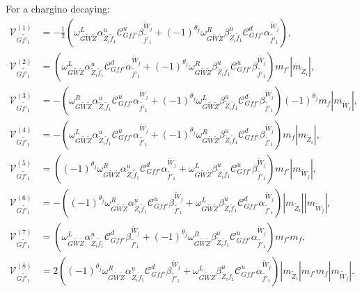 \documentclass[final,3p,times,pdflatex]{elsarticle}
\begin{document}
For a chargino decaying:
\begin{align}
\mathcal{V}_{G \tilde{f'}_1}^{(1)} &= -\frac{1}{2}(\omega_{G \tilde{W} \tilde{Z}}^L   \alpha_{\tilde{Z}_i \tilde{f}_1}^{u}  \mathcal{C}_{G f f'}^u  \beta_{\tilde{f'}_1}^{\tilde{W}_j} +  (-1)^{\theta_f}\omega_{G \tilde{W} \tilde{Z}}^R  \beta_{\tilde{Z}_i \tilde{f}_1}^{u}  \mathcal{C}_{G f f'}^d  \alpha_{\tilde{f'}_1}^{\tilde{W}_j}), \\
\mathcal{V}_{G \tilde{f'}_1}^{(2)} &= (\omega_{G \tilde{W} \tilde{Z}}^L  \alpha_{\tilde{Z}_i \tilde{f}_1}^{u}  \mathcal{C}_{G f f'}^d  \alpha_{\tilde{f'}_1}^{\tilde{W}_j} +  (-1)^{\theta_j}\omega_{G \tilde{W} \tilde{Z}}^R  \beta_{\tilde{Z}_i \tilde{f}_1}^{u}  \mathcal{C}_{G f f'}^u  \beta_{\tilde{f'}_1}^{\tilde{W}_j})m_{f'}|m_{\tilde{Z}_i}|, \\
\mathcal{V}_{G \tilde{f'}_1}^{(3)} &= -(\omega_{G \tilde{W} \tilde{Z}}^R  \alpha_{\tilde{Z}_i \tilde{f}_1}^{u}  \mathcal{C}_{G f f'}^u  \alpha_{\tilde{f'}_1}^{\tilde{W}_j} +  (-1)^{\theta_j}\omega_{G \tilde{W} \tilde{Z}}^L  \beta_{\tilde{Z}_i \tilde{f}_1}^{u}  \mathcal{C}_{G f f'}^d  \beta_{\tilde{f'}_1}^{\tilde{W}_j})(-1)^{\theta_j} m_{f}|m_{\tilde{W}_j}|, \\
\mathcal{V}_{G \tilde{f'}_1}^{(4)} &= -(\omega_{G \tilde{W} \tilde{Z}}^L   \alpha_{\tilde{Z}_i \tilde{f}_1}^{u}  \mathcal{C}_{G f f'}^u  \alpha_{\tilde{f'}_1}^{\tilde{W}_j} +  (-1)^{\theta_j}\omega_{G \tilde{W} \tilde{Z}}^R  \beta_{\tilde{Z}_i \tilde{f}_1}^{u}  \mathcal{C}_{G f f'}^d  \beta_{\tilde{f'}_1}^{\tilde{W}_j})m_{f}|m_{\tilde{Z}_i}|, \\
\mathcal{V}_{G \tilde{f'}_1}^{(5)} &= ((-1)^{\theta_j}\omega_{G \tilde{W} \tilde{Z}}^R \alpha_{\tilde{Z}_i \tilde{f}_1}^{u}  \mathcal{C}_{G f f'}^d  \alpha_{\tilde{f'}_1}^{\tilde{W}_j} + \omega_{G \tilde{W} \tilde{Z}}^L  \beta_{\tilde{Z}_i \tilde{f}_1}^{u}  \mathcal{C}_{G f f'}^u  \beta_{\tilde{f'}_1}^{\tilde{W}_j})m_{f'} |m_{\tilde{W}_j}|,\\
\mathcal{V}_{G \tilde{f'}_1}^{(6)} &= -((-1)^{\theta_j}\omega_{G \tilde{W} \tilde{Z}}^R \alpha_{\tilde{Z}_i \tilde{f}_1}^{u}  \mathcal{C}_{G f f'}^u  \beta_{\tilde{f'}_1}^{\tilde{W}_j} + \omega_{G \tilde{W} \tilde{Z}}^L  \beta_{\tilde{Z}_i \tilde{f}_1}^{u}  \mathcal{C}_{G f f'}^d  \alpha_{\tilde{f'}_1}^{\tilde{W}_j})|m_{\tilde{Z}_i}||m_{\tilde{W}_j}| ,\\
\mathcal{V}_{G \tilde{f'}_1}^{(7)} &= (\omega_{G \tilde{W} \tilde{Z}}^L \alpha_{\tilde{Z}_i \tilde{f}_1}^{u}  \mathcal{C}_{G f f'}^d  \beta_{\tilde{f'}_1}^{\tilde{W}_j} + (-1)^{\theta_j}\omega_{G \tilde{W} \tilde{Z}}^R  \beta_{\tilde{Z}_i \tilde{f}_1}^{u} \mathcal{C}_{G f f'}^u \alpha_{\tilde{f'}_1}^{\tilde{W}_j})m_{f'}m_{f}, \\
\mathcal{V}_{G \tilde{f'}_1}^{(8)} &= 2((-1)^{\theta_j}\omega_{G \tilde{W} \tilde{Z}}^R  \alpha_{\tilde{Z}_i \tilde{f}_1}^{u}  \mathcal{C}_{G f f'}^d  \beta_{\tilde{f'}_1}^{\tilde{W}_j} + \omega_{G \tilde{W} \tilde{Z}}^L  \beta_{\tilde{Z}_i \tilde{f}_1}^{u}  \mathcal{C}_{G f f'}^u  \alpha_{\tilde{f'}_1}^{\tilde{W}_j})|m_{\tilde{Z}_i}|m_{f'}m_{f}|m_{\tilde{W}_j}|.
\end{align}
\end{document}
